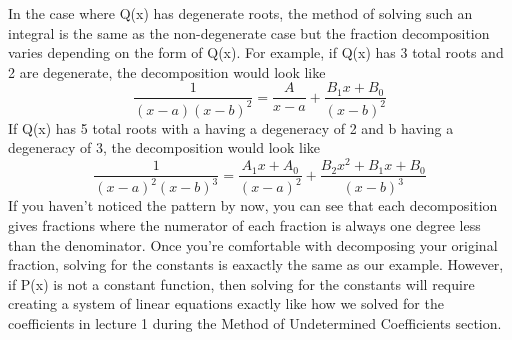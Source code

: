 \documentclass{article}
\newcommand{\be}{\begin{equation}}
\newcommand{\ee}{\end{equation}}
\begin{document}
In the case where Q(x) has degenerate roots, the method of solving such an integral is the same as the non-degenerate case but the fraction decomposition varies depending on the form of Q(x).
For example, if Q(x) has 3 total roots and 2 are degenerate, the decomposition would look like
\be
\frac{1}{(x-a)(x-b)^2}  = \frac{A}{x-a} + \frac{B_1x + B_0}{(x-b)^2}
\ee
If Q(x) has 5 total roots with a having a degeneracy of 2 and b having a degeneracy of 3, the decomposition would look like
\be
\frac{1}{(x-a)^2(x-b)^3} = \frac{A_1x + A_0}{(x-a)^2} + \frac{B_2x^2 + B_1x + B_0}{(x-b)^3}
\ee
If you haven't noticed the pattern by now, you can see that each decomposition gives fractions where the numerator of each fraction is always one degree less than the denominator.
Once you're comfortable with decomposing your original fraction, solving for the constants is eaxactly the same as our example.
However, if P(x) is not a constant function, then solving for the constants will require creating a system of linear equations exactly like how we solved for the coefficients in lecture 1 during the Method of Undetermined Coefficients section.
\end{document}
